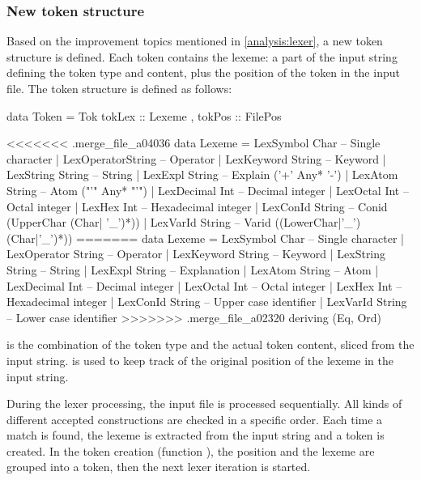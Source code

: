\subsubsection{New token structure}
Based on the improvement topics mentioned in \autoref{analysis:lexer}, a new token structure is defined.
Each token contains the lexeme: a part of the input string defining the token type and content, plus the position of the token in the input file.
The token structure is defined as follows:

\begin{haskell}
data Token = Tok { tokLex :: Lexeme
                 , tokPos :: FilePos
                 }
                        
<<<<<<< .merge_file_a04036
data Lexeme = LexSymbol    Char       -- Single character
            | LexOperatorString  -- Operator
            | LexKeyword String  -- Keyword
            | LexString  String  -- String
            | LexExpl    String  -- Explain ('{+' Any* '-}')
            | LexAtom    String  -- Atom    ("'" Any* "'")
            | LexDecimal Int     -- Decimal integer
            | LexOctal   Int     -- Octal integer
            | LexHex     Int     -- Hexadecimal integer
            | LexConId   String  -- Conid (UpperChar (Char| '_')*))
            | LexVarId   String  -- Varid ((LowerChar|'_')(Char|'_')*))
=======
data Lexeme  = LexSymbol      Char           -- Single character
             | LexOperator    String         -- Operator
             | LexKeyword     String         -- Keyword
             | LexString      String         -- String
             | LexExpl        String         -- Explanation
             | LexAtom        String         -- Atom
             | LexDecimal     Int            -- Decimal integer
             | LexOctal       Int            -- Octal integer
             | LexHex         Int            -- Hexadecimal integer
             | LexConId       String         -- Upper case identifier
             | LexVarId       String         -- Lower case identifier
>>>>>>> .merge_file_a02320
  deriving (Eq, Ord)
\end{haskell}
%
 is the combination of the token type and the actual token content, sliced from the input string.
 is used to keep track of the original position of the lexeme in the input string.

During the lexer processing, the input file is processed sequentially.
All kinds of different accepted constructions are checked in a specific order.
Each time a match is found, the lexeme is extracted from the input string and a token is created.
In the token creation (function ), the position and the lexeme are grouped into a token, then the next lexer iteration is started.
